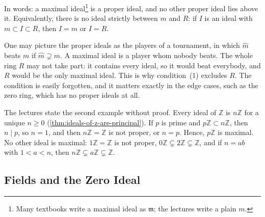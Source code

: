 In words: a maximal ideal\footnote{Many textbooks write a maximal ideal as $\mathfrak{m}$; the lectures write a plain $m$.} is a proper ideal, and no other proper ideal lies above it. Equivalently, there is no ideal strictly between $m$ and $R$: if $I$ is an ideal with $m \subset I \subset R$, then $I = m$ or $I = R$.

One may picture the proper ideals as the players of a tournament, in which $\hat{m}$ beats $m$ if $\hat{m} \supsetneq m$. A maximal ideal is a player whom nobody beats. The whole ring $R$ may not take part: it contains every ideal, so it would beat everybody, and $R$ would be the only maximal ideal. This is why condition~(1) excludes $R$. The condition is easily forgotten, and it matters exactly in the edge cases, such as the zero ring, which has no proper ideals at all.


\begin{beyond}
The lectures state the second example without proof. Every ideal of $\mathbb{Z}$ is $n\mathbb{Z}$ for a unique $n \ge 0$ (\cref{thm:ideals-of-z-are-principal}). If $p$ is prime and $p\mathbb{Z} \subset n\mathbb{Z}$, then $n \mid p$, so $n = 1$, and then $n\mathbb{Z} = \mathbb{Z}$ is not proper, or $n = p$. Hence, $p\mathbb{Z}$ is maximal. No other ideal is maximal: $1\mathbb{Z} = \mathbb{Z}$ is not proper, $0\mathbb{Z} \subsetneq 2\mathbb{Z} \subsetneq \mathbb{Z}$, and if $n = ab$ with $1 < a < n$, then $n\mathbb{Z} \subsetneq a\mathbb{Z} \subsetneq \mathbb{Z}$.
\end{beyond}

\subsection{Fields and the Zero Ideal}

